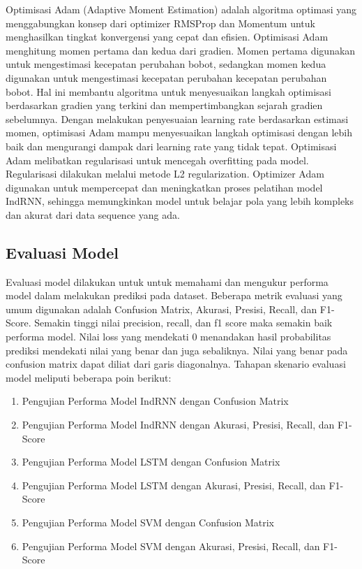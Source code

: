\begin{enumerate}[nolistsep]
            Optimisasi Adam (Adaptive Moment Estimation) adalah algoritma optimasi yang menggabungkan konsep dari optimizer RMSProp dan Momentum
            untuk menghasilkan tingkat konvergensi yang cepat dan efisien. Optimisasi Adam menghitung momen pertama dan kedua dari gradien. Momen
            pertama digunakan untuk mengestimasi kecepatan perubahan bobot, sedangkan momen kedua digunakan untuk mengestimasi kecepatan perubahan
            kecepatan perubahan bobot. Hal ini membantu algoritma untuk menyesuaikan langkah optimisasi berdasarkan gradien yang terkini dan
            mempertimbangkan sejarah gradien sebelumnya. Dengan melakukan penyesuaian learning rate berdasarkan estimasi momen, optimisasi Adam
            mampu menyesuaikan langkah optimisasi dengan lebih baik dan mengurangi dampak dari learning rate yang tidak tepat. Optimisasi Adam
            melibatkan regularisasi untuk mencegah overfitting pada model. Regularisasi dilakukan melalui metode L2 regularization.
            Optimizer Adam digunakan untuk mempercepat dan meningkatkan proses pelatihan model IndRNN, sehingga memungkinkan model
            untuk belajar pola yang lebih kompleks dan akurat dari data sequence yang ada.
\end{enumerate}

\subsection{Evaluasi Model}
Evaluasi model dilakukan untuk untuk memahami dan mengukur performa model dalam melakukan prediksi pada dataset.
Beberapa metrik evaluasi yang umum digunakan adalah Confusion Matrix, Akurasi,
Presisi, Recall, dan F1-Score. Semakin tinggi nilai precision, recall, dan f1 score maka semakin baik performa model. Nilai loss yang
mendekati 0 menandakan hasil probabilitas prediksi mendekati nilai yang benar dan juga sebaliknya. Nilai
yang benar pada confusion matrix dapat diliat dari garis diagonalnya. Tahapan skenario evaluasi model
meliputi beberapa poin berikut:

\begin{enumerate}[nolistsep]
      \item Pengujian Performa Model IndRNN dengan Confusion Matrix
      \item Pengujian Performa Model IndRNN dengan Akurasi, Presisi, Recall, dan F1-Score
      \item Pengujian Performa Model LSTM dengan Confusion Matrix
      \item Pengujian Performa Model LSTM dengan Akurasi, Presisi, Recall, dan F1-Score
      \item Pengujian Performa Model SVM dengan Confusion Matrix
      \item Pengujian Performa Model SVM dengan Akurasi, Presisi, Recall, dan F1-Score
\end{enumerate}

